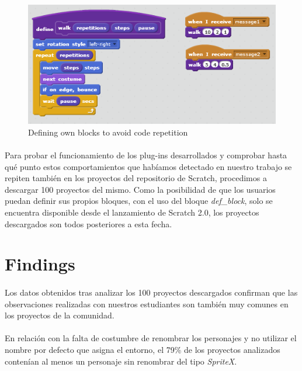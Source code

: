 \documentclass[a4paper,10pt]{article}
\begin{document}
\begin{figure}
  \centering
    \includegraphics{img/CodeRepetition2.png}
  \caption{Defining own blocks to avoid code repetition}
  \label{fig:CodeRepetition2}
\end{figure}

\paragraph{}Para probar el funcionamiento de los plug-ins desarrollados y comprobar hasta qué punto estos comportamientos que habíamos detectado en nuestro trabajo se repiten también en los proyectos del repositorio de Scratch, procedimos a descargar 100 proyectos del mismo. Como la posibilidad de que los usuarios puedan definir sus propios bloques, con el uso del bloque \textit{def\_block}, solo se encuentra disponible desde el lanzamiento de Scratch 2.0, los proyectos descargados son todos posteriores a esta fecha.


\section{Findings}
\paragraph{}Los datos obtenidos tras analizar los 100 proyectos descargados confirman que las observaciones realizadas con nuestros estudiantes son también muy comunes en los proyectos de la comunidad. 
\paragraph{}En relación con la falta de costumbre de renombrar los personajes y no utilizar el nombre por defecto que asigna el entorno, el 79\% de los proyectos analizados contenían al menos un personaje sin renombrar del tipo \textit{SpriteX}.
\end{document}
